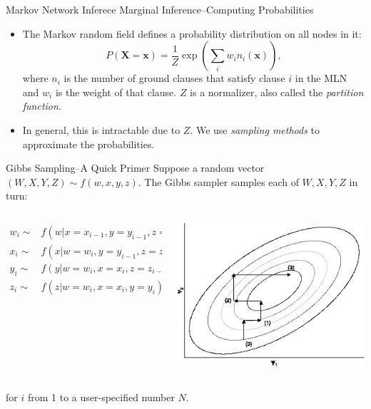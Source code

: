 \documentclass[onlymath,xcolor=pdftex,dvipsnames,table]{beamer}
\let\oldemph\emph
\renewcommand{\emph}[1]{{\color{Blue}\oldemph{#1}}}
\theoremstyle{remark} %
\begin{document}
\begin{frame}{Markov Network Inferece}
Marginal Inference--Computing Probabilities
\begin{itemize}
\item The Markov random field defines a probability distribution on all nodes in it:
$$P(\mathbf{X}=\mathbf{x})=\frac{1}{Z}\exp\left(\sum_iw_in_i(\mathbf{x})\right),$$
where $n_i$ is the number of ground clauses that satisfy clause $i$ in the MLN and $w_i$ is the weight of that clause. $Z$ is a normalizer, also called the \emph{partition function}.
\item In general, this is intractable due to $Z$. We use \emph{sampling methods} to approximate the probabilities.
\end{itemize}
\end{frame}

\begin{frame}{Gibbs Sampling--A Quick Primer}
Suppose a random vector $(W,X,Y,Z)\sim f(w,x,y,z)$. The Gibbs sampler samples each of $W,X,Y,Z$ in turn:
\begin{columns}
  \begin{column}{.7\textwidth}
    \begin{align}
      w_i\sim & f(w|x=x_{i-1}, y=y_{i-1}, z=z_{i-1})\nonumber\\
      x_i\sim & f(x|w=w_i, y=y_{i-1}, z=z_{i-1})\nonumber\\
      y_i\sim & f(y|w=w_i, x=x_i, z=z_{i-1})\nonumber\\
      z_i\sim & f(z|w=w_i, x=x_i, y=y_i)\nonumber
    \end{align}
  \end{column}
  \begin{column}{.3\textwidth}
    \includegraphics[width=\columnwidth]{gibbs.jpg}
  \end{column}
\end{columns}
\vspace*{8pt}
for $i$ from 1 to a user-specified number $N$.
\end{frame}
\end{document}
